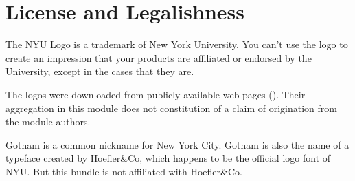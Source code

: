 \documentclass{ltxdoc}
\begin{document}
\section{License and Legalishness}

The NYU Logo is a trademark of New York University.  You can't use the logo to
create an impression that your products are affiliated or endorsed by the University,
except in the cases that they are.

The logos were downloaded from publicly available web pages (\cite{nyu-downloads}).
Their aggregation in this module does not constitution of a claim of origination
from the module authors.

Gotham is a common nickname for New York City.  Gotham is also the name of a typeface
created by Hoefler\&Co, which happens to be the official logo font of NYU.
But this bundle is not affiliated with Hoefler\&Co.



\end{document}
